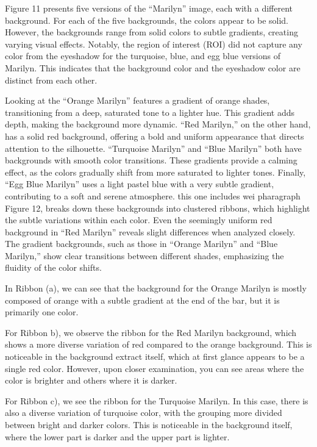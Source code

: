 \documentclass{article}
\begin{document}
Figure 11 presents five versions of the ``Marilyn'' image, each with a
different background. For each of the five backgrounds, the colors
appear to be solid. However, the backgrounds range from solid colors to
subtle gradients, creating varying visual effects. Notably, the region
of interest (ROI) did not capture any color from the eyeshadow for the
turquoise, blue, and egg blue versions of Marilyn. This indicates that
the background color and the eyeshadow color are distinct from each
other.

Looking at the ``Orange Marilyn'' features a gradient of orange shades,
transitioning from a deep, saturated tone to a lighter hue. This
gradient adds depth, making the background more dynamic. ``Red
Marilyn,'' on the other hand, has a solid red background, offering a
bold and uniform appearance that directs attention to the silhouette.
``Turquoise Marilyn'' and ``Blue Marilyn'' both have backgrounds with
smooth color transitions. These gradients provide a calming effect, as
the colors gradually shift from more saturated to lighter tones.
Finally, ``Egg Blue Marilyn'' uses a light pastel blue with a very
subtle gradient, contributing to a soft and serene atmosphere. this one
includes wei pharagraph Figure 12, breaks down these backgrounds into
clustered ribbons, which highlight the subtle variations within each
color. Even the seemingly uniform red background in ``Red Marilyn''
reveals slight differences when analyzed closely. The gradient
backgrounds, such as those in ``Orange Marilyn'' and ``Blue Marilyn,''
show clear transitions between different shades, emphasizing the
fluidity of the color shifts.

In Ribbon (a), we can see that the background for the Orange Marilyn is
mostly composed of orange with a subtle gradient at the end of the bar,
but it is primarily one color.

For Ribbon b), we observe the ribbon for the Red Marilyn background,
which shows a more diverse variation of red compared to the orange
background. This is noticeable in the background extract itself, which
at first glance appears to be a single red color. However, upon closer
examination, you can see areas where the color is brighter and others
where it is darker.

For Ribbon c), we see the ribbon for the Turquoise Marilyn. In this
case, there is also a diverse variation of turquoise color, with the
grouping more divided between bright and darker colors. This is
noticeable in the background itself, where the lower part is darker and
the upper part is lighter.
\end{document}
